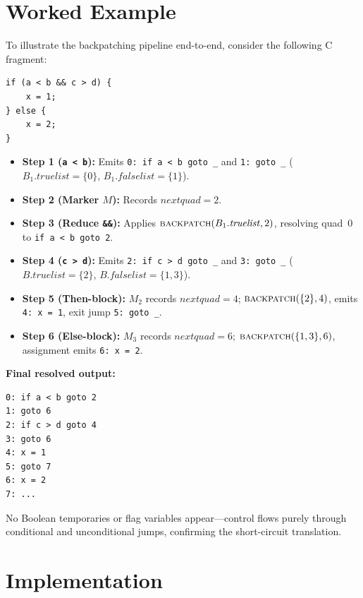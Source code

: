 \documentclass[conference]{IEEEtran}
\begin{document}
\section{Worked Example}
\label{sec:example}

To illustrate the backpatching pipeline end-to-end, consider the following C fragment:
\begin{lstlisting}
if (a < b && c > d) {
    x = 1;
} else {
    x = 2;
}
\end{lstlisting}

\begin{itemize}[leftmargin=*,noitemsep,topsep=1.5pt]
\item \textbf{Step 1 (\texttt{a < b}):} Emits \texttt{0: if a < b goto \_} and \texttt{1: goto \_} ($B_1.\mathit{truelist}=\{0\}$, $B_1.\mathit{falselist}=\{1\}$).
\item \textbf{Step 2 (Marker $M$):} Records $\mathit{nextquad} = 2$.
\item \textbf{Step 3 (Reduce \texttt{\&\&}):} Applies $\textsc{backpatch}(B_1.\mathit{truelist}, 2)$, resolving quad~0 to \texttt{if a < b goto 2}.
\item \textbf{Step 4 (\texttt{c > d}):} Emits \texttt{2: if c > d goto \_} and \texttt{3: goto \_} ($B.\mathit{truelist}=\{2\}$, $B.\mathit{falselist}=\{1, 3\}$).
\item \textbf{Step 5 (Then-block):} $M_2$ records $\mathit{nextquad}=4$; $\textsc{backpatch}(\{2\}, 4)$, emits \texttt{4: x = 1}, exit jump \texttt{5: goto \_}.
\item \textbf{Step 6 (Else-block):} $M_3$ records $\mathit{nextquad}=6$; $\textsc{backpatch}(\{1, 3\}, 6)$, assignment emits \texttt{6: x = 2}.
\end{itemize}

\noindent\textbf{Final resolved output:}
\begin{lstlisting}[style=quad]
0: if a < b goto 2
1: goto 6
2: if c > d goto 4
3: goto 6
4: x = 1
5: goto 7
6: x = 2
7: ...
\end{lstlisting}
No Boolean temporaries or flag variables appear---control flows purely through conditional and unconditional jumps, confirming the short-circuit translation.

\section{Implementation}
\label{sec:impl}
\end{document}
